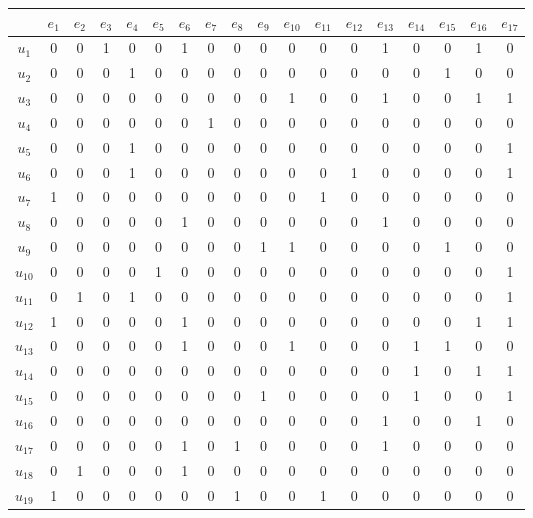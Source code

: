 \documentclass[12pt, a4paper] {ncc}
\begin{document}
\begin{tabular}{|c|c|c|c|c|c|c|c|c|c|c|c|c|c|c|c|c|c|}
\hline
      & $e_{1}$ & $e_{2}$ & $e_{3}$ & $e_{4}$ & $e_{5}$ & $e_{6}$ & $e_{7}$ & $e_{8}$ & $e_{9}$ & $e_{10}$ & $e_{11}$ & $e_{12}$ & $e_{13}$ & $e_{14}$ & $e_{15}$ & $e_{16}$ & $e_{17}$ \\
\hline   %
$u_{1} $ & 0 & 0 & 1 & 0 & 0 & 1 & 0 & 0 & 0 & 0 & 0 & 0 & 1 & 0 & 0 & 1 & 0 \\
$u_{2} $ & 0 & 0 & 0 & 1 & 0 & 0 & 0 & 0 & 0 & 0 & 0 & 0 & 0 & 0 & 1 & 0 & 0 \\
$u_{3} $ & 0 & 0 & 0 & 0 & 0 & 0 & 0 & 0 & 0 & 1 & 0 & 0 & 1 & 0 & 0 & 1 & 1 \\
$u_{4} $ & 0 & 0 & 0 & 0 & 0 & 0 & 1 & 0 & 0 & 0 & 0 & 0 & 0 & 0 & 0 & 0 & 0 \\
$u_{5} $ & 0 & 0 & 0 & 1 & 0 & 0 & 0 & 0 & 0 & 0 & 0 & 0 & 0 & 0 & 0 & 0 & 1 \\
$u_{6} $ & 0 & 0 & 0 & 1 & 0 & 0 & 0 & 0 & 0 & 0 & 0 & 1 & 0 & 0 & 0 & 0 & 1 \\
$u_{7} $ & 1 & 0 & 0 & 0 & 0 & 0 & 0 & 0 & 0 & 0 & 1 & 0 & 0 & 0 & 0 & 0 & 0 \\
$u_{8} $ & 0 & 0 & 0 & 0 & 0 & 1 & 0 & 0 & 0 & 0 & 0 & 0 & 1 & 0 & 0 & 0 & 0 \\
$u_{9} $ & 0 & 0 & 0 & 0 & 0 & 0 & 0 & 0 & 1 & 1 & 0 & 0 & 0 & 0 & 1 & 0 & 0 \\
$u_{10}$ & 0 & 0 & 0 & 0 & 1 & 0 & 0 & 0 & 0 & 0 & 0 & 0 & 0 & 0 & 0 & 0 & 1 \\
$u_{11}$ & 0 & 1 & 0 & 1 & 0 & 0 & 0 & 0 & 0 & 0 & 0 & 0 & 0 & 0 & 0 & 0 & 1 \\
$u_{12}$ & 1 & 0 & 0 & 0 & 0 & 1 & 0 & 0 & 0 & 0 & 0 & 0 & 0 & 0 & 0 & 1 & 1 \\
$u_{13}$ & 0 & 0 & 0 & 0 & 0 & 1 & 0 & 0 & 0 & 1 & 0 & 0 & 0 & 1 & 1 & 0 & 0 \\
$u_{14}$ & 0 & 0 & 0 & 0 & 0 & 0 & 0 & 0 & 0 & 0 & 0 & 0 & 0 & 1 & 0 & 1 & 1 \\
$u_{15}$ & 0 & 0 & 0 & 0 & 0 & 0 & 0 & 0 & 1 & 0 & 0 & 0 & 0 & 1 & 0 & 0 & 1 \\
$u_{16}$ & 0 & 0 & 0 & 0 & 0 & 0 & 0 & 0 & 0 & 0 & 0 & 0 & 1 & 0 & 0 & 1 & 0 \\
$u_{17}$ & 0 & 0 & 0 & 0 & 0 & 1 & 0 & 1 & 0 & 0 & 0 & 0 & 1 & 0 & 0 & 0 & 0 \\
$u_{18}$ & 0 & 1 & 0 & 0 & 0 & 1 & 0 & 0 & 0 & 0 & 0 & 0 & 0 & 0 & 0 & 0 & 0 \\
$u_{19}$ & 1 & 0 & 0 & 0 & 0 & 0 & 0 & 1 & 0 & 0 & 1 & 0 & 0 & 0 & 0 & 0 & 0 \\

\end{tabular}
\end{document}
